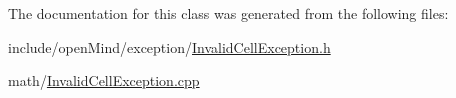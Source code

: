 The documentation for this class was generated from the following files\+:\begin{DoxyCompactItemize}
\item 
include/open\+Mind/exception/\hyperlink{_invalid_cell_exception_8h}{Invalid\+Cell\+Exception.\+h}\item 
math/\hyperlink{_invalid_cell_exception_8cpp}{Invalid\+Cell\+Exception.\+cpp}\end{DoxyCompactItemize}
